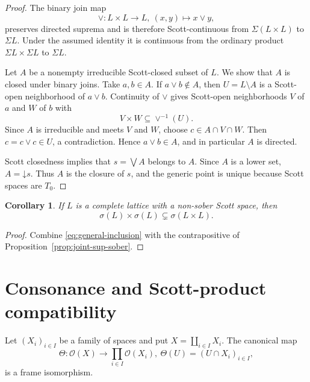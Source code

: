 \documentclass[11pt,reqno]{amsart}
\newtheorem{corollary}[theorem]{Corollary}
\theoremstyle{definition}
\numberwithin{equation}{section}
\newcommand{\OO}{\mathcal O}
\begin{document}
\begin{proof}
The binary join map
\[
  \vee:L\times L\longrightarrow L,~ (x,y)\longmapsto x\vee y,
\]
preserves directed suprema and is therefore Scott-continuous from
$\Sigma(L\times L)$ to $\Sigma L$. Under the assumed identity it is
continuous from the ordinary product $\Sigma L\times\Sigma L$ to
$\Sigma L$.

Let $A$ be a nonempty irreducible Scott-closed subset of $L$. We show that
$A$ is closed under binary joins. Take $a,b\in A$. If $a\vee b\notin A$,
then $U=L\setminus A$ is a Scott-open neighborhood of $a\vee b$.
Continuity of $\vee$ gives Scott-open neighborhoods $V$ of $a$ and $W$ of
$b$ with
\[
  V\times W\subseteq\vee^{-1}(U).
\]
Since $A$ is irreducible and meets $V$ and $W$, choose
$c\in A\cap V\cap W$. Then $c=c\vee c\in U$, a contradiction. Hence
$a\vee b\in A$, and in particular $A$ is directed.

Scott closedness implies that $s=\bigvee A$ belongs to $A$. Since $A$ is
a lower set, $A=\mathord{{\downarrow}}s$. Thus $A$ is the closure of $s$,
and the generic point is unique because Scott spaces are $T_0$.
\end{proof}

\begin{corollary}\label{cor:product-strict}
If $L$ is a complete lattice with a non-sober Scott space, then
\[
  \sigma(L)\times\sigma(L)\subsetneq\sigma(L\times L).
\]
\end{corollary}

\begin{proof}
Combine \eqref{eq:general-inclusion} with the contrapositive of
Proposition~\ref{prop:joint-sup-sober}.
\end{proof}

\section{Consonance and Scott-product compatibility}\label{sec:consonance}

Let $(X_i)_{i\in I}$ be a family of spaces and put
$X=\coprod_{i\in I}X_i$.  The canonical map
\begin{equation}\label{eq:theta}
  \Theta:\OO(X)\longrightarrow\prod_{i\in I}\OO(X_i),
  ~ \Theta(U)=(U\cap X_i)_{i\in I},
\end{equation}
is a frame isomorphism.
\end{document}
